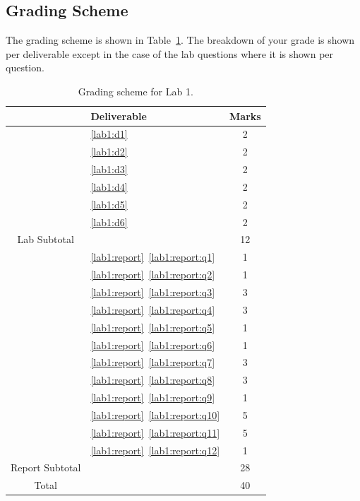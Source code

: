 \subsection{Grading Scheme}
The grading scheme is shown in Table~\ref{tab:lab1:grading}. The breakdown of
your grade is shown per deliverable except in the case of the lab
questions where it is shown per question.
%
\begin{table}
\centering
\begin{tabular}{c|l|c}
        & Deliverable           & Marks  \\ \hline
        & \ref{lab1:d1}         & 2       \\ \hline
        & \ref{lab1:d2}         & 2       \\ \hline
        & \ref{lab1:d3}         & 2       \\ \hline
        & \ref{lab1:d4}         & 2       \\ \hline
        & \ref{lab1:d5}         & 2       \\ \hline
        & \ref{lab1:d6}         & 2       \\ \hhline{=|=|=}
Lab Subtotal&                       & 12      \\ \hhline{=|=|=}
        & \ref{lab1:report}~\ref{lab1:report:q1}  & 1       \\ \hline
        & \ref{lab1:report}~\ref{lab1:report:q2}  & 1       \\ \hline
        & \ref{lab1:report}~\ref{lab1:report:q3}  & 3       \\ \hline
        & \ref{lab1:report}~\ref{lab1:report:q4}  & 3       \\ \hline
        & \ref{lab1:report}~\ref{lab1:report:q5}  & 1       \\ \hline
        & \ref{lab1:report}~\ref{lab1:report:q6}  & 1       \\ \hline
        & \ref{lab1:report}~\ref{lab1:report:q7}  & 3       \\ \hline
        & \ref{lab1:report}~\ref{lab1:report:q8}  & 3       \\ \hline
        & \ref{lab1:report}~\ref{lab1:report:q9}  & 1       \\ \hline
        & \ref{lab1:report}~\ref{lab1:report:q10} & 5       \\ \hline
        & \ref{lab1:report}~\ref{lab1:report:q11} & 5       \\ \hline
        & \ref{lab1:report}~\ref{lab1:report:q12} & 1       \\ \hhline{=|=|=}
Report Subtotal&  & 28 \\ \hhline{=|=|=}
  Total &                       & 40
\end{tabular}
\caption[Grading Scheme for Lab 1]{Grading scheme for Lab 1.}
\label{tab:lab1:grading}
\end{table}
%
